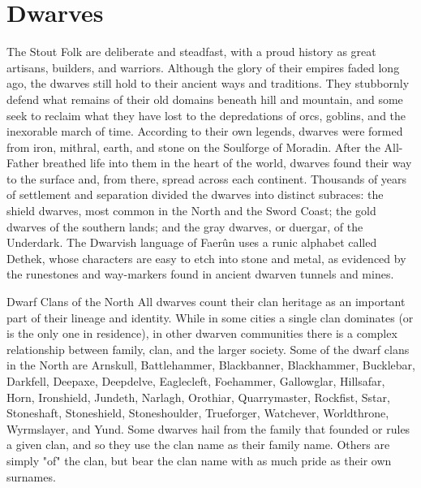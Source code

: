 \documentclass[10pt,a4paper,twoside,twocolumn,openany,bg=print,nodeprecatedcode]{dndbook}
\begin{document}
\section{Dwarves}
The Stout Folk are deliberate and steadfast, with a proud history as great artisans, builders, and warriors. Although the glory of their empires faded long ago, the dwarves still hold to their ancient ways and traditions. They stubbornly defend what remains of their old domains beneath hill and mountain, and some seek to reclaim what they have lost to the depredations of orcs, goblins, and the inexorable march of time.
According to their own legends, dwarves were formed from iron, mithral, earth, and stone on the Soulforge of Moradin. After the All-Father breathed life into them in the heart of the world, dwarves found their way to the surface and, from there, spread across each continent.
Thousands of years of settlement and separation divided the dwarves into distinct subraces: the shield dwarves, most common in the North and the Sword Coast; the gold dwarves of the southern lands; and the gray dwarves, or duergar, of the Underdark.
The Dwarvish language of Faerûn uses a runic alphabet called Dethek, whose characters are easy to etch into stone and metal, as evidenced by the runestones and way-markers found in ancient dwarven tunnels and mines.
\begin{DndComment}{Dwarf Clans of the North}
All dwarves count their clan heritage as an important part of their lineage and identity. While in some cities a single clan dominates (or is the only one in residence), in other dwarven communities there is a complex relationship between family, clan, and the larger society.
Some of the dwarf clans in the North are Arnskull, Battlehammer, Blackbanner, Blackhammer, Bucklebar, Darkfell, Deepaxe, Deepdelve, Eaglecleft, Foehammer, Gallowglar, Hillsafar, Horn, Ironshield, Jundeth, Narlagh, Orothiar, Quarrymaster, Rockfist, Sstar, Stoneshaft, Stoneshield, Stoneshoulder, Trueforger, Watchever, Worldthrone, Wyrmslayer, and Yund.
Some dwarves hail from the family that founded or rules a given clan, and so they use the clan name as their family name. Others are simply "of" the clan, but bear the clan name with as much pride as their own surnames.
\end{DndComment}
\end{document}
